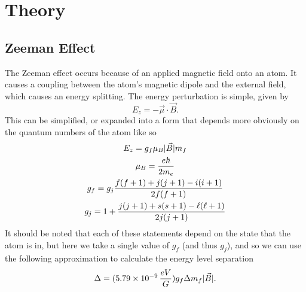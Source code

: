 \documentclass{article}
\DeclarePairedDelimiter\abs{\lvert}{\rvert}%
\begin{document}
\section{Theory}%
  \subsection{Zeeman Effect}
    The Zeeman effect occurs because of an applied magnetic field onto an atom.  It causes a coupling between the atom's magnetic dipole and the external field, which causes an energy splitting.  The energy perturbation is simple, given by
    \begin{equation*}
      E_z = -\vec{\mu} \cdot \vec{B}.
    \end{equation*}
    This can be simplified, or expanded into a form that depends more obviously on the quantum numbers of the atom like so
    \begin{gather*}
      E_z = g_f \mu_B \abs{\vec{B}} m_f \\
      \mu_B = \frac{e \hbar}{2m_e} \\
      g_f = g_j\frac{f(f+1) + j(j+1) - i(i+1)}{2f(f+1)} \\
      g_j = 1 + \frac{j(j+1) + s(s+1) - \ell(\ell+1)}{2j(j+1)}
    \end{gather*}
    It should be noted that each of these statements depend on the state that the atom is in, but here we take a single value of $g_f$ (and thus $g_j$), and so we can use the following approximation to calculate the energy level separation
    \begin{equation}
      \Delta = (5.79 \times 10^{-9} \, \frac{eV}{G}) g_f \Delta m_f \abs{\vec{B}}.
    \end{equation}
\end{document}
